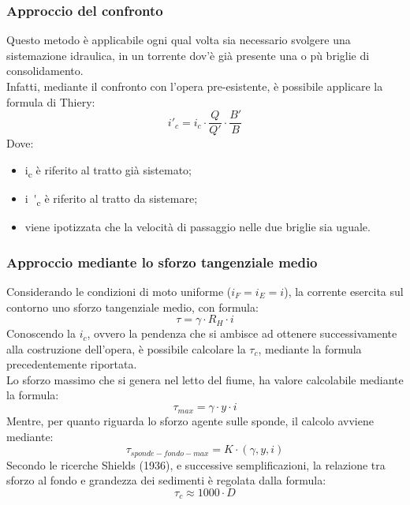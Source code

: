 \subsubsection{Approccio del confronto}
Questo metodo è applicabile ogni qual volta sia necessario svolgere una sistemazione idraulica, in un torrente dov'è già presente una o pù briglie di consolidamento.\\
Infatti, mediante il confronto con l'opera pre-esistente, è possibile applicare la formula di Thiery:
\begin{equation}
    i'_c = i_c \cdot \frac{Q}{Q'} \cdot \frac{B'}{B}
\end{equation}
Dove:
\begin{itemize}
    \item \unit{i_c} è riferito al tratto già sistemato;
    \item \unit{i'_c} è riferito al tratto da sistemare;
    \item viene ipotizzata che la velocità di passaggio nelle due briglie sia uguale.
\end{itemize}
\subsubsection{Approccio mediante lo sforzo tangenziale medio}
Considerando le condizioni di moto uniforme ($i_F=i_E=i$), la corrente esercita sul contorno uno sforzo tangenziale medio, con formula:
\begin{equation}
    \tau = \gamma \cdot R_H \cdot i
\end{equation}
Conoscendo la $i_c$, ovvero la pendenza che si ambisce ad ottenere successivamente alla costruzione dell'opera, è possibile calcolare la $\tau_{c}$, mediante la formula precedentemente riportata.\\
Lo sforzo massimo che si genera nel letto del fiume, ha valore calcolabile mediante la formula:
\begin{equation}
    \tau_{max} = \gamma \cdot y \cdot i
\end{equation}
Mentre, per quanto riguarda lo sforzo agente sulle sponde, il calcolo avviene mediante:
\begin{equation}
    \tau_{sponde-fondo-max}= K \cdot (\gamma, y, i)
\end{equation}
Secondo le ricerche Shields (1936), e successive semplificazioni, la relazione tra sforzo al fondo e grandezza dei sedimenti è regolata dalla formula:
\begin{equation}
    \tau_c \approx 1000 \cdot D
    \label{eq:tau_cr_shields}
\end{equation}
